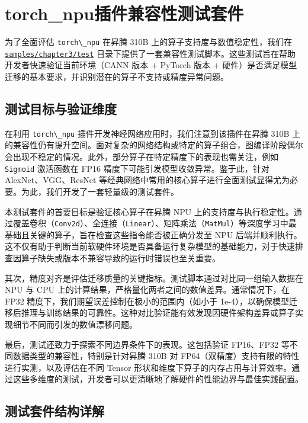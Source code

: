 \section{torch\_npu插件兼容性测试套件}\label{src-book-chapter3-h15}

为了全面评估 \passthrough{\lstinline!torch\_npu!} 在昇腾 310B
上的算子支持度与数值稳定性，我们在
\href{https://github.com/zhouxzh/Ascend310/tree/main/samples/chapter3/test}{\passthrough{\lstinline!samples/chapter3/test!}}
目录下提供了一套兼容性测试脚本。这些测试旨在帮助开发者快速验证当前环境（CANN
版本 + PyTorch 版本 +
硬件）是否满足模型迁移的基本要求，并识别潜在的算子不支持或精度异常问题。

\subsection{测试目标与验证维度}\label{src-book-chapter3-h16}

在利用 \passthrough{\lstinline!torch\_npu!}
插件开发神经网络应用时，我们注意到该插件在昇腾 310B
上的兼容性仍有提升空间。面对复杂的网络结构或特定的算子组合，图编译阶段偶尔会出现不稳定的情况。此外，部分算子在特定精度下的表现也需关注，例如
\passthrough{\lstinline!Sigmoid!} 激活函数在 FP16
精度下可能引发模型收敛异常。鉴于此，针对 AlexNet、VGG、ResNet
等经典网络中常用的核心算子进行全面测试显得尤为必要。为此，我们开发了一套轻量级的测试套件。

本测试套件的首要目标是验证核心算子在昇腾 NPU
上的支持度与执行稳定性。通过覆盖卷积（\passthrough{\lstinline!Conv2d!}）、全连接（\passthrough{\lstinline!Linear!}）、矩阵乘法（\passthrough{\lstinline!MatMul!}）等深度学习中最基础且关键的算子，旨在检查这些指令能否被正确分发至
NPU
后端并顺利执行。这不仅有助于判断当前软硬件环境是否具备运行复杂模型的基础能力，对于快速排查因算子缺失或版本不兼容导致的运行时错误也至关重要。

其次，精度对齐是评估迁移质量的关键指标。测试脚本通过对比同一组输入数据在
NPU 与 CPU 上的计算结果，严格量化两者之间的数值差异。通常情况下，在 FP32
精度下，我们期望误差控制在极小的范围内（如小于
1e-4），以确保模型迁移后推理与训练结果的可靠性。这种对比验证能有效发现因硬件架构差异或算子实现细节不同而引发的数值漂移问题。

最后，测试还致力于探索不同边界条件下的表现。这包括验证 FP16、FP32
等不同数据类型的兼容性，特别是针对昇腾 310B 对
FP64（双精度）支持有限的特性进行实测，以及评估在不同 Tensor
形状和维度下算子的内存占用与计算效率。通过这些多维度的测试，开发者可以更清晰地了解硬件的性能边界与最佳实践配置。

\subsection{测试套件结构详解}\label{src-book-chapter3-h17}

